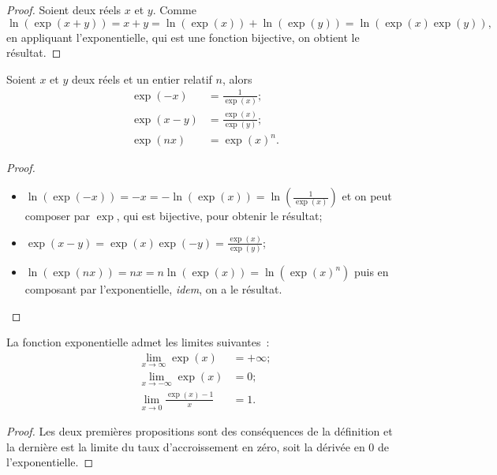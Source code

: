 \begin{proof}
    Soient deux réels \(x\) et \(y\). Comme
    \begin{equation}
        \ln(\exp(x+y))=x+y=\ln(\exp(x))+\ln(\exp(y))=\ln(\exp(x) \exp(y)),
    \end{equation}
    en appliquant l'exponentielle, qui est une fonction bijective, on 
    obtient le résultat.
\end{proof}
\begin{prop}
    Soient \(x\) et \(y\) deux réels et un entier relatif \(n\), alors
    \begin{align}
        \exp(-x)&=\frac{1}{\exp(x)}; \\
        \exp(x-y)&=\frac{\exp(x)}{\exp(y)}; \\
        \exp(nx)&=\exp(x)^n.
    \end{align}
\end{prop}
\begin{proof}
    \begin{itemize}
        \item \(\ln(\exp(-x))=-x=-\ln(\exp(x))=\ln 
            \left(\frac{1}{\exp(x)}\right)\) et on peut composer par 
            \(\exp\), qui est bijective, pour obtenir le résultat;
        \item \(\exp(x-y)=\exp(x) \exp(-y)=\frac{\exp(x)}{\exp(y)}\);
        \item \(\ln(\exp(nx))=nx=n \ln(\exp(x))=\ln(\exp(x)^n)\) puis en 
            composant par l'exponentielle, \emph{idem}, on a le résultat.
    \end{itemize}
\end{proof}
\begin{prop}
    La fonction exponentielle admet les limites suivantes~:
    \begin{align}
        \lim\limits_{x \to \infty} \exp(x)&=+\infty;\\
        \lim\limits_{x \to -\infty} \exp(x)&=0;\\
        \lim\limits_{x \to 0} \frac{\exp(x)-1}{x}&=1.
    \end{align}
\end{prop}
\begin{proof}
    Les deux premières propositions sont des conséquences de la définition 
    et la dernière est la limite du taux d'accroissement en zéro, soit la 
    dérivée en 0 de l'exponentielle.
\end{proof}
